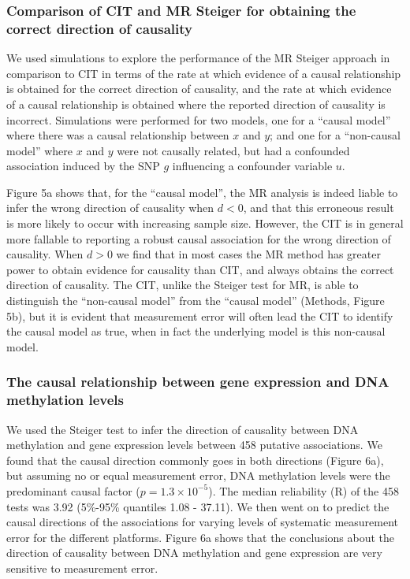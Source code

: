\documentclass[]{article}
\begin{document}
\subsubsection{Comparison of CIT and MR Steiger for obtaining the
correct direction of
causality}\label{comparison-of-cit-and-mr-steiger-for-obtaining-the-correct-direction-of-causality}

We used simulations to explore the performance of the MR Steiger
approach in comparison to CIT in terms of the rate at which evidence of
a causal relationship is obtained for the correct direction of
causality, and the rate at which evidence of a causal relationship is
obtained where the reported direction of causality is incorrect.
Simulations were performed for two models, one for a ``causal model''
where there was a causal relationship between \(x\) and \(y\); and one
for a ``non-causal model'' where \(x\) and \(y\) were not causally
related, but had a confounded association induced by the SNP \(g\)
influencing a confounder variable \(u\).

Figure 5a shows that, for the ``causal model'', the MR analysis is
indeed liable to infer the wrong direction of causality when \(d < 0\),
and that this erroneous result is more likely to occur with increasing
sample size. However, the CIT is in general more fallable to reporting a
robust causal association for the wrong direction of causality. When
\(d > 0\) we find that in most cases the MR method has greater power to
obtain evidence for causality than CIT, and always obtains the correct
direction of causality. The CIT, unlike the Steiger test for MR, is able
to distinguish the ``non-causal model'' from the ``causal model''
(Methods, Figure 5b), but it is evident that measurement error will
often lead the CIT to identify the causal model as true, when in fact
the underlying model is this non-causal model.

\subsubsection{The causal relationship between gene expression and DNA
methylation
levels}\label{the-causal-relationship-between-gene-expression-and-dna-methylation-levels}

We used the Steiger test to infer the direction of causality between DNA
methylation and gene expression levels between 458 putative
associations. We found that the causal direction commonly goes in both
directions (Figure 6a), but assuming no or equal measurement error, DNA
methylation levels were the predominant causal factor
(\(p = 1.3\times 10^{-5}\)). The median reliability (R) of the 458 tests
was 3.92 (5\%-95\% quantiles 1.08 - 37.11). We then went on to predict
the causal directions of the associations for varying levels of
systematic measurement error for the different platforms. Figure 6a
shows that the conclusions about the direction of causality between DNA
methylation and gene expression are very sensitive to measurement error.
\end{document}
